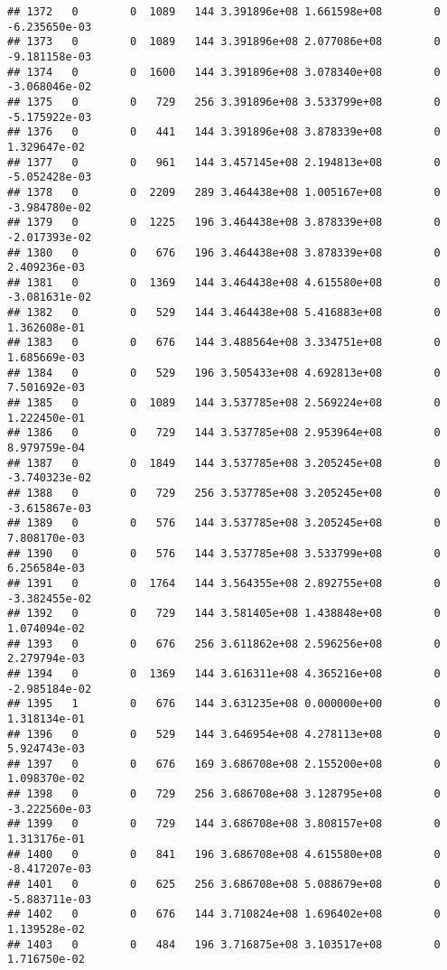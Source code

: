 \documentclass[
]{article}
\begin{document}
\begin{enumerate}
\begin{verbatim}
## 1372   0        0  1089   144 3.391896e+08 1.661598e+08        0 -6.235650e-03
## 1373   0        0  1089   144 3.391896e+08 2.077086e+08        0 -9.181158e-03
## 1374   0        0  1600   144 3.391896e+08 3.078340e+08        0 -3.068046e-02
## 1375   0        0   729   256 3.391896e+08 3.533799e+08        0 -5.175922e-03
## 1376   0        0   441   144 3.391896e+08 3.878339e+08        0  1.329647e-02
## 1377   0        0   961   144 3.457145e+08 2.194813e+08        0 -5.052428e-03
## 1378   0        0  2209   289 3.464438e+08 1.005167e+08        0 -3.984780e-02
## 1379   0        0  1225   196 3.464438e+08 3.878339e+08        0 -2.017393e-02
## 1380   0        0   676   196 3.464438e+08 3.878339e+08        0  2.409236e-03
## 1381   0        0  1369   144 3.464438e+08 4.615580e+08        0 -3.081631e-02
## 1382   0        0   529   144 3.464438e+08 5.416883e+08        0  1.362608e-01
## 1383   0        0   676   144 3.488564e+08 3.334751e+08        0  1.685669e-03
## 1384   0        0   529   196 3.505433e+08 4.692813e+08        0  7.501692e-03
## 1385   0        0  1089   144 3.537785e+08 2.569224e+08        0  1.222450e-01
## 1386   0        0   729   144 3.537785e+08 2.953964e+08        0  8.979759e-04
## 1387   0        0  1849   144 3.537785e+08 3.205245e+08        0 -3.740323e-02
## 1388   0        0   729   256 3.537785e+08 3.205245e+08        0 -3.615867e-03
## 1389   0        0   576   144 3.537785e+08 3.205245e+08        0  7.808170e-03
## 1390   0        0   576   144 3.537785e+08 3.533799e+08        0  6.256584e-03
## 1391   0        0  1764   144 3.564355e+08 2.892755e+08        0 -3.382455e-02
## 1392   0        0   729   144 3.581405e+08 1.438848e+08        0  1.074094e-02
## 1393   0        0   676   256 3.611862e+08 2.596256e+08        0  2.279794e-03
## 1394   0        0  1369   144 3.616311e+08 4.365216e+08        0 -2.985184e-02
## 1395   1        0   676   144 3.631235e+08 0.000000e+00        0  1.318134e-01
## 1396   0        0   529   144 3.646954e+08 4.278113e+08        0  5.924743e-03
## 1397   0        0   676   169 3.686708e+08 2.155200e+08        0  1.098370e-02
## 1398   0        0   729   256 3.686708e+08 3.128795e+08        0 -3.222560e-03
## 1399   0        0   729   144 3.686708e+08 3.808157e+08        0  1.313176e-01
## 1400   0        0   841   196 3.686708e+08 4.615580e+08        0 -8.417207e-03
## 1401   0        0   625   256 3.686708e+08 5.088679e+08        0 -5.883711e-03
## 1402   0        0   676   144 3.710824e+08 1.696402e+08        0  1.139528e-02
## 1403   0        0   484   196 3.716875e+08 3.103517e+08        0  1.716750e-02

\end{verbatim}
\end{enumerate}
\end{document}
